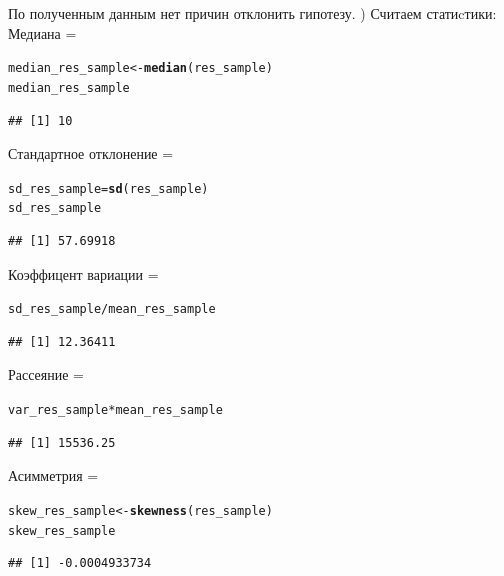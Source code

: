 \documentclass{article}\usepackage[]{graphicx}\usepackage[]{color}
\makeatletter
\newcommand{\hlopt}[1]{\textcolor[rgb]{0,0,0}{#1}}%
\newcommand{\hlstd}[1]{\textcolor[rgb]{0.345,0.345,0.345}{#1}}%
\newcommand{\hlkwb}[1]{\textcolor[rgb]{0.69,0.353,0.396}{#1}}%
\newcommand{\hlkwd}[1]{\textcolor[rgb]{0.737,0.353,0.396}{\textbf{#1}}}%
\newenvironment{kframe}{%
 \def\at@end@of@kframe{}%
 \ifinner\ifhmode%
  \def\at@end@of@kframe{\end{minipage}}%
  \begin{minipage}{\columnwidth}%
 \fi\fi%
 \def\FrameCommand##1{\hskip\@totalleftmargin \hskip-\fboxsep
 \colorbox{shadecolor}{##1}\hskip-\fboxsep
     \hskip-\linewidth \hskip-\@totalleftmargin \hskip\columnwidth}%
 \MakeFramed {\advance\hsize-\width
   \@totalleftmargin\z@ \linewidth\hsize
   \@setminipage}}%
 {\par\unskip\endMakeFramed%
 \at@end@of@kframe}
\newenvironment{knitrout}{}{} %
\makeatother
\begin{document}
По полученным данным нет причин отклонить гипотезу.
) Считаем статиcтики:
Медиана = 
\begin{knitrout}
\color{fgcolor}\begin{kframe}
\begin{alltt}
\hlstd{median_res_sample} \hlkwb{<-} \hlkwd{median}\hlstd{(res_sample)}
\hlstd{median_res_sample}
\end{alltt}
\begin{verbatim}
## [1] 10
\end{verbatim}
\end{kframe}
\end{knitrout}
Стандартное отклонение = 
\begin{knitrout}
\color{fgcolor}\begin{kframe}
\begin{alltt}
\hlstd{sd_res_sample} \hlkwb{=} \hlkwd{sd}\hlstd{(res_sample)}
\hlstd{sd_res_sample}
\end{alltt}
\begin{verbatim}
## [1] 57.69918
\end{verbatim}
\end{kframe}
\end{knitrout}
Коэффицент вариации = 
\begin{knitrout}
\color{fgcolor}\begin{kframe}
\begin{alltt}
\hlstd{sd_res_sample} \hlopt{/} \hlstd{mean_res_sample}
\end{alltt}
\begin{verbatim}
## [1] 12.36411
\end{verbatim}
\end{kframe}
\end{knitrout}
Рассеяние = 
\begin{knitrout}
\color{fgcolor}\begin{kframe}
\begin{alltt}
\hlstd{var_res_sample} \hlopt{*} \hlstd{mean_res_sample}
\end{alltt}
\begin{verbatim}
## [1] 15536.25
\end{verbatim}
\end{kframe}
\end{knitrout}
Асимметрия = 
\begin{knitrout}
\color{fgcolor}\begin{kframe}
\begin{alltt}
\hlstd{skew_res_sample} \hlkwb{<-} \hlkwd{skewness}\hlstd{(res_sample)}
\hlstd{skew_res_sample}
\end{alltt}
\begin{verbatim}
## [1] -0.0004933734
\end{verbatim}
\end{kframe}
\end{knitrout}
\end{document}
